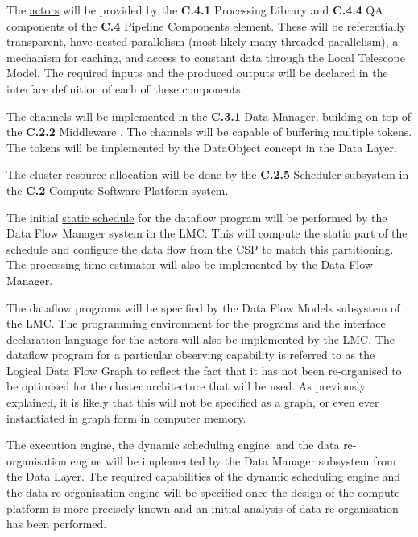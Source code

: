 \documentclass[11pt,a4paper]{article}
\begin{document}
The \underline{actors} will be provided by the {\bf C.4.1} Processing
Library and {\bf C.4.4} QA components of the {\bf C.4} Pipeline
Components element. These will be referentially transparent, have
nested parallelism (most likely many-threaded parallelism), a
mechanism for caching, and access to constant data through the Local
Telescope Model. The required inputs and the produced outputs will be
declared in the interface definition of each of these components.

The \underline{channels} will be implemented in the {\bf C.3.1} Data
Manager, building on top of the {\bf C.2.2} Middleware . The channels
will be capable of buffering multiple tokens.  The tokens will be
implemented by the DataObject concept in the Data Layer.

The cluster resource allocation will be done by the {\bf C.2.5}
Scheduler subsystem in the {\bf C.2} Compute Software Platform system.

The initial \underline{static schedule} for the dataflow program will
be performed by the Data Flow Manager system in the LMC. This will
compute the static part of the schedule and configure the data flow
from the CSP to match this partitioning. The processing time estimator
will also be implemented by the Data Flow Manager.

The dataflow programs will be specified by the Data Flow Models
subsystem of the LMC.  The programming environment for the programs
and the interface declaration language for the actors will also be
implemented by the LMC.  The dataflow program for a particular
observing capability is referred to as the Logical Data Flow Graph to
reflect the fact that it has not been re-organised to be optimised for
the cluster architecture that will be used. As previously explained,
it is likely that this will not be specified as a graph, or even ever
instantiated in graph form in computer memory.

The execution engine, the dynamic scheduling engine, and the data
re-organisation engine will be implemented by the Data Manager
subsystem from the Data Layer. The required capabilities of the
dynamic scheduling engine and the data-re-organisation engine will be
specified once the design of the compute platform is more precisely
known and an initial analysis of data re-organisation has been
performed.

\clearpage
{}
%
\end{document}
